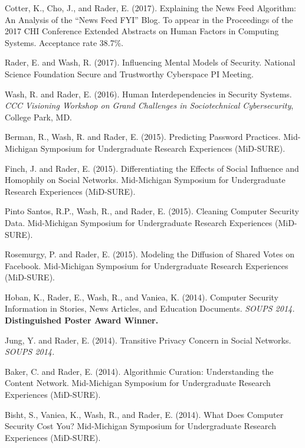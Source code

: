 \documentclass[9pt]{extarticle}
\makeatletter
\renewcommand{\section}{%
  \@startsection{section}{1}{0em}{\baselineskip}{3pt}{\large\bfseries\textsc}}
\makeatother
\begin{document}
\section{Extended Abstracts and Posters}

Cotter, K., Cho, J., and Rader, E. (2017). Explaining the News Feed Algorithm: An Analysis of the ``News Feed FYI'' Blog. To appear in the Proceedings of the 2017 CHI Conference Extended Abstracts on Human Factors in Computing Systems. Acceptance rate 38.7\%.

Rader, E. and Wash, R. (2017). Influencing Mental Models of Security. National Science Foundation Secure and Trustworthy Cyberspace PI Meeting.

Wash, R. and Rader, E. (2016). Human Interdependencies in Security Systems. \emph{CCC Visioning Workshop on Grand Challenges in Sociotechnical Cybersecurity}, College Park, MD.

Berman, R., Wash, R. and Rader, E. (2015). Predicting Password Practices. Mid-Michigan Symposium for Undergraduate Research Experiences (MiD-SURE).

Finch, J. and Rader, E. (2015). Differentiating the Effects of Social Influence and Homophily on Social Networks. Mid-Michigan Symposium for Undergraduate Research Experiences (MiD-SURE).

Pinto Santos, R.P., Wash, R., and Rader, E. (2015). Cleaning Computer Security Data. Mid-Michigan Symposium for Undergraduate Research Experiences (MiD-SURE).

Rosemurgy, P. and Rader, E. (2015). Modeling the Diffusion of Shared Votes on Facebook. Mid-Michigan Symposium for Undergraduate Research Experiences (MiD-SURE).

Hoban, K., Rader, E., Wash, R., and Vaniea, K. (2014). Computer Security Information in Stories, News Articles, and Education Documents. \emph{SOUPS 2014.} \textbf{Distinguished Poster Award Winner.}

Jung, Y. and Rader, E. (2014). Transitive Privacy Concern in Social Networks. \emph{SOUPS 2014.}

Baker, C. and Rader, E. (2014). Algorithmic Curation: Understanding the Content Network. Mid-Michigan Symposium for Undergraduate Research Experiences (MiD-SURE).

Bisht, S., Vaniea, K., Wash, R., and Rader, E. (2014). What Does Computer Security Cost You? Mid-Michigan Symposium for Undergraduate Research Experiences (MiD-SURE).
\end{document}
